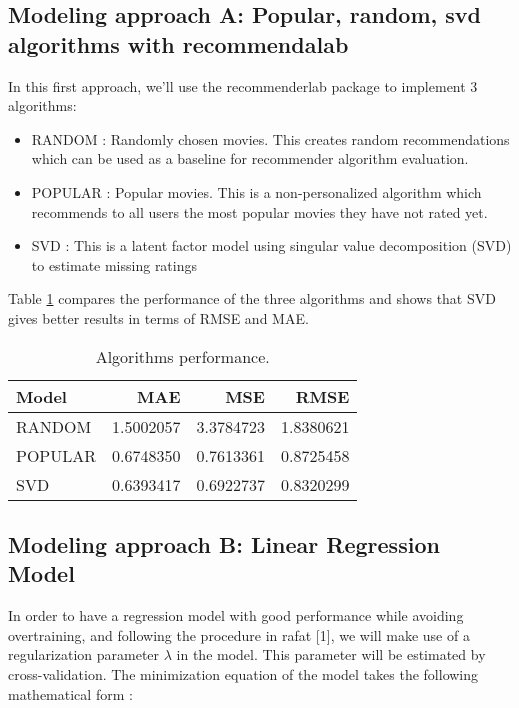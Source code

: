 \documentclass[
]{article}
\begin{document}
\subsection{Modeling approach A: Popular, random, svd algorithms with recommendalab}\label{modeling-approach-a-popular-random-svd-algorithms-with-recommendalab}

In this first approach, we'll use the recommenderlab package to implement 3 algorithms:

\begin{itemize}
\item
  RANDOM : Randomly chosen movies. This creates random recommendations which can
  be used as a baseline for recommender algorithm evaluation.
\item
  POPULAR : Popular movies. This is a non-personalized algorithm which recommends to
  all users the most popular movies they have not rated yet.
\item
  SVD : This is a latent factor model using singular value decomposition (SVD) to estimate missing
  ratings
\end{itemize}

Table \ref{tab:modelA} compares the performance of the three algorithms and shows that SVD gives better results in terms of RMSE and MAE.

\begin{table}[H]
\centering
\caption{\label{tab:modelA}Algorithms performance.}
\centering
\begin{tabular}[t]{lrrr}
\toprule
Model & MAE & MSE & RMSE\\
\midrule
RANDOM & 1.5002057 & 3.3784723 & 1.8380621\\
POPULAR & 0.6748350 & 0.7613361 & 0.8725458\\
SVD & 0.6393417 & 0.6922737 & 0.8320299\\
\bottomrule
\end{tabular}
\end{table}

\subsection{Modeling approach B: Linear Regression Model}\label{modeling-approach-b-linear-regression-model}

In order to have a regression model with good performance while avoiding overtraining, and following the procedure in rafat {[}1{]}, we will make use of a regularization parameter \(\lambda\) in the model. This parameter will be estimated by cross-validation. The minimization equation of the model takes the following mathematical form :
\end{document}

